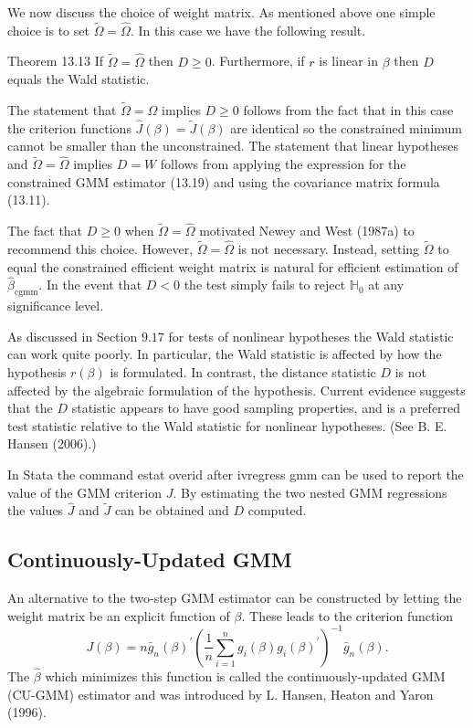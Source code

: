 \documentclass[10pt]{article}
\begin{document}
We now discuss the choice of weight matrix. As mentioned above one simple choice is to set $\widetilde{\Omega}=\widehat{\Omega}$. In this case we have the following result.

Theorem 13.13 If $\widetilde{\Omega}=\widehat{\Omega}$ then $D \geq 0$. Furthermore, if $r$ is linear in $\beta$ then $D$ equals the Wald statistic.

The statement that $\widetilde{\Omega}=\widehat{\Omega}$ implies $D \geq 0$ follows from the fact that in this case the criterion functions $\widehat{J}(\beta)=\widetilde{J}(\beta)$ are identical so the constrained minimum cannot be smaller than the unconstrained. The statement that linear hypotheses and $\widetilde{\Omega}=\widehat{\Omega}$ implies $D=W$ follows from applying the expression for the constrained GMM estimator (13.19) and using the covariance matrix formula (13.11).

The fact that $D \geq 0$ when $\widetilde{\Omega}=\widehat{\Omega}$ motivated Newey and West (1987a) to recommend this choice. However, $\widetilde{\Omega}=\widehat{\Omega}$ is not necessary. Instead, setting $\widetilde{\Omega}$ to equal the constrained efficient weight matrix is natural for efficient estimation of $\widehat{\beta}_{\mathrm{cgmm}}$. In the event that $D<0$ the test simply fails to reject $\mathbb{H}_{0}$ at any significance level.

As discussed in Section $9.17$ for tests of nonlinear hypotheses the Wald statistic can work quite poorly. In particular, the Wald statistic is affected by how the hypothesis $r(\beta)$ is formulated. In contrast, the distance statistic $D$ is not affected by the algebraic formulation of the hypothesis. Current evidence suggests that the $D$ statistic appears to have good sampling properties, and is a preferred test statistic relative to the Wald statistic for nonlinear hypotheses. (See B. E. Hansen (2006).)

In Stata the command estat overid after ivregress gmm can be used to report the value of the GMM criterion $J$. By estimating the two nested GMM regressions the values $\widehat{J}$ and $\widetilde{J}$ can be obtained and $D$ computed.

\subsection{Continuously-Updated GMM}
An alternative to the two-step GMM estimator can be constructed by letting the weight matrix be an explicit function of $\beta$. These leads to the criterion function
$$
J(\beta)=n \bar{g}_{n}(\beta)^{\prime}\left(\frac{1}{n} \sum_{i=1}^{n} g_{i}(\beta) g_{i}(\beta)^{\prime}\right)^{-1} \bar{g}_{n}(\beta) .
$$
The $\widehat{\beta}$ which minimizes this function is called the continuously-updated GMM (CU-GMM) estimator and was introduced by L. Hansen, Heaton and Yaron (1996).
\end{document}
